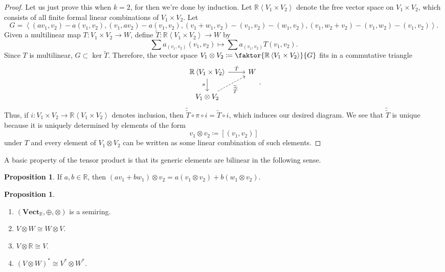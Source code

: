 \documentclass[10pt,letterpaper,cm]{nupset}
\theoremstyle{definition}
\theoremstyle{theorem}
\newtheorem{prop}[definition]{Proposition}
\theoremstyle{remark}
\newcommand{\R}{\mathbb R}
\newcommand{\1}{\mathbf{1}}
\newcommand{\0}{\vec 0}
\begin{document}
\begin{proof}
Let us just prove this when $k=2$, for then we're done by induction. Let $\R\left\langle V_1 \times V_2 \right\rangle$ denote the free vector space on $V_1 \times V_2$, which consists of  all finite formal linear combinations of $V_1 \times V_2$. Let 
\[
G = \left\langle (av_1, v_2) - a(v_1, v_2), (v_1, av_2) - a(v_1, v_2), (v_1 + w_1, v_2) - (v_1, v_2)-(w_1, v_2), (v_1, w_2 + v_2) - (v_1, w_2) -(v_1, v_2)\right\rangle.
\]
Given a  multilinear map $T: V_1 \times V_2 \to W$, define $\widetilde{T} : \R\left\langle V_1 \times V_2\right\rangle \to W$ by $$\sum a_{(v_1, v_2)}(v_1, v_2) \mapsto \sum a_{(v_1, v_2)} T(v_1, v_2).$$ Since $T$ is multilinear, $G \subset \ker \widetilde{T}$. Therefore,  the vector space $V_1 \otimes V_2 \coloneqq  \faktor{\R\left\langle V_1 \times V_2 \right\rangle}{G}$ fits in a commutative triangle 
\[
\begin{tikzcd}
\R\left\langle V_1 \times V_2 \right\rangle \arrow[d, "\pi"'] \arrow[r, "\tilde{T}"] & W \\
V_1 \otimes V_2 \arrow[ru, "\widetilde{\widetilde{T}}"', dashed] & 
\end{tikzcd}.
\]
Thus, if $i: V_1 \times V_2 \to \R\left\langle V_1 \times V_2 \right\rangle$ denotes inclusion, then $\widetilde{\widetilde{T}} \circ \pi \circ i = \widetilde{T} \circ i$, which induces our desired diagram. We see that $\widetilde{\widetilde{T}}$ is unique because it is uniquely determined by elements of the form $$v_1 \otimes v_2\coloneqq \left[(v_1, v_2)\right]$$ under $T$ and every element of $V_1 \otimes V_2$ can be written as some linear combination of such elements.
\end{proof}

\smallskip

A basic property of the tensor product is that its generic elements are bilinear in the following sense.

\begin{prop}
If $a,b \in \R$, then $\left(av_1 + bw_1\right) \otimes v_2 = a(v_1 \otimes v_2) + b(w_1 \otimes v_2)$.
\end{prop}

\begin{prop} $ $
\begin{enumerate}
\item $\left(\mathbf{Vect}_{\R}, \oplus, \otimes\right)$ is a semiring. 
\item $V \otimes W \cong W \otimes V$.
\item $V \otimes \R \cong V$.
\item $\left(V \otimes W\right)^{\ast} \cong V^{\ast} \otimes W^{\ast}$.
\end{enumerate}
\end{prop}
\end{document}
